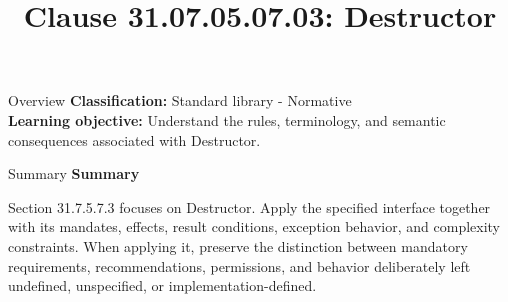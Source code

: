 \documentclass[10pt,letterpaper]{article}
\title{Clause 31.07.05.07.03: Destructor}
\author{}
\date{}
\begin{document}
\maketitle
\begin{CornellOverviewBox}{Overview}
\textbf{Classification:} Standard library - Normative\\[2pt]
\textbf{Learning objective:} Understand the rules, terminology, and semantic consequences associated with Destructor.
\end{CornellOverviewBox}\begin{CornellSummaryBox}{Summary}
{\sffamily\bfseries\color{Accent} Summary}\par\vspace{3pt}Section 31.7.5.7.3 focuses on Destructor. Apply the specified interface together with its mandates, effects, result conditions, exception behavior, and complexity constraints. When applying it, preserve the distinction between mandatory requirements, recommendations, permissions, and behavior deliberately left undefined, unspecified, or implementation-defined.
\end{CornellSummaryBox}
\end{document}
